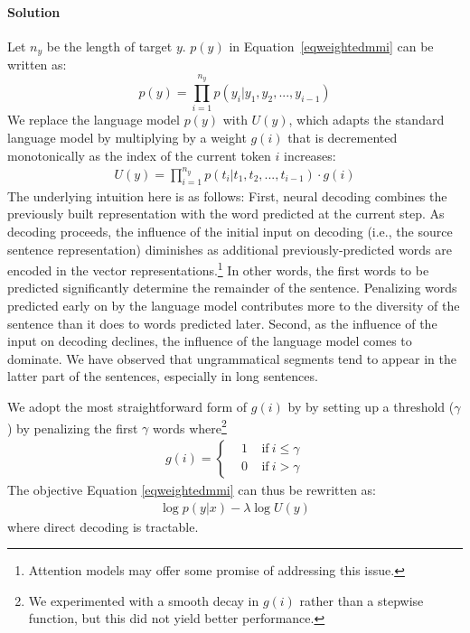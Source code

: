 \paragraph{Solution}
Let $n_y$ be the length of target $y$.
$p(y)$ in Equation~\ref{eqweightedmmi} can be written as:
\begin{equation}
p(y)=\prod_{i=1}^{n_y}p(y_i|y_1,y_2,...,y_{i-1})
\end{equation}
We replace the language model $p(y)$ with $U(y)$, which adapts the standard language model by multiplying by a weight $g(i)$ that is decremented monotonically as the index of the current token $i$ increases:
\begin{equation}
\begin{aligned}
U(y)=\prod_{i=1}^{n_y}p(t_i|t_1,t_2,...,t_{i-1})\cdot g(i)
\end{aligned}
\label{eqmonotonic}
\end{equation}
The underlying intuition here is as follows:
First, neural decoding combines the previously built representation with the word predicted at the current step. 
As decoding proceeds, the influence of the initial input on decoding (i.e., the source sentence representation) diminishes as additional previously-predicted words are encoded in the vector representations.\footnote{Attention models \cite{xu2015show} may offer some promise of addressing this issue.}
In other words, the first words to be predicted significantly determine the remainder of the sentence. 
Penalizing words predicted early on by the language model contributes more to the diversity of the sentence than it does to words predicted later. 
Second, as the influence of the input on decoding declines, 
the influence of the language model comes to dominate. 
We have observed that ungrammatical segments tend to appear in the latter part of the sentences, especially in long sentences. 

We adopt the most straightforward form of $g(i)$ by 
by setting up a threshold ($\gamma$) by penalizing the first $\gamma$ words where\footnote{We experimented with a smooth decay in $g(i)$ rather than a stepwise function, but this did not yield better performance.}
\begin{equation}
\begin{aligned}
g(i)
= \left\{
\begin{aligned}
&1~~~~~\text{if}~i\leq\gamma \\
&0~~~~~\text{if}~i>\gamma
\end{aligned}
\right.
\end{aligned}
\end{equation}
The objective Equation \ref{eqweightedmmi} 
can thus be rewritten as: 
\begin{equation}
\begin{aligned}
\log p(y|x) - \lambda \log U(y)
\end{aligned}
\label{eqweightedpos}
\end{equation}
where direct decoding is tractable.
 

